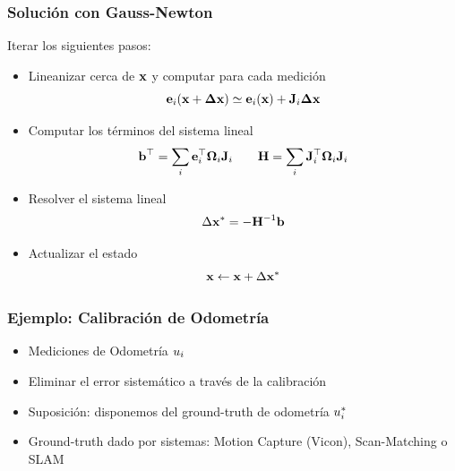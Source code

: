\begin{frame}
    \frametitle{Solución con Gauss-Newton}
    
    Iterar los siguientes pasos:
    \begin{itemize}
        \item Lineanizar cerca de $\boldsymbol{\mathbf{x}}$ y computar para cada medición
        \begin{equation*}
            \boldsymbol{\mathbf{e}}_{i}(\boldsymbol{\mathbf{x}} + \boldsymbol{\mathbf{\Delta}}\boldsymbol{\mathbf{x}}) \simeq  \boldsymbol{\mathbf{e}}_{i}(\boldsymbol{\mathbf{x}}) + \boldsymbol{\mathbf{J}}_{i}\boldsymbol{\mathbf{\Delta}}\boldsymbol{\mathbf{x}}
        \end{equation*}
        \item Computar los términos del sistema lineal
        \begin{equation*}
            \boldsymbol{\mathbf{b}}^{\top} = \sum_{i} \boldsymbol{\mathbf{e}}_{i}^{\top} \boldsymbol{\mathbf{\Omega}}_{i} \boldsymbol{\mathbf{J}}_{i} \quad \quad \boldsymbol{\mathbf{H}} = \sum_{i} \boldsymbol{\mathbf{J}}_{i}^{\top} \boldsymbol{\mathbf{\Omega}}_{i} \boldsymbol{\mathbf{J}}_{i}
        \end{equation*}
    \item Resolver el sistema lineal
    \begin{equation*}
        \Delta \boldsymbol{\mathbf{x}}^{*} = - {\boldsymbol{\mathbf{H}}}^{-1} \boldsymbol{\mathbf{b}} 
    \end{equation*}
    \item Actualizar el estado
    \begin{equation*}
        \boldsymbol{\mathbf{x}} \leftarrow \boldsymbol{\mathbf{x}} + \Delta \boldsymbol{\mathbf{x}}^{*}
    \end{equation*} 
    \end{itemize}
    
\end{frame}

\begin{frame}
    \frametitle{Ejemplo: Calibración de Odometría}
    
    \begin{itemize}
        \item Mediciones de Odometría $u_{i}$
        \item Eliminar el error sistemático a través de la calibración
        \item Suposición: disponemos del ground-truth de odometría $u_{i}^{*}$
        \item Ground-truth dado por sistemas: Motion Capture (Vicon), Scan-Matching o SLAM
    \end{itemize}
    
\end{frame}

